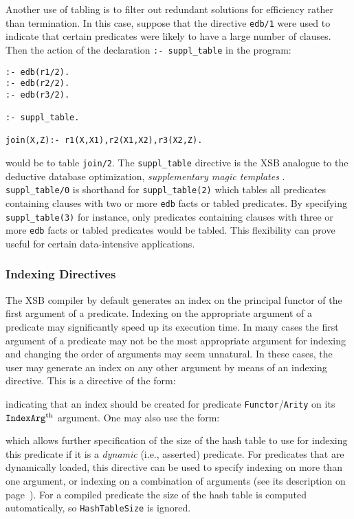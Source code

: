 Another use of tabling is to filter out redundant solutions for
efficiency rather than termination.  In this case, suppose that the
directive {\tt edb/1} were used to indicate that certain predicates were
likely to have a large number of clauses.  Then the action of the declaration
{\tt :- suppl\_table} in the program:
\begin{verbatim}
:- edb(r1/2).
:- edb(r2/2).
:- edb(r3/2).

:- suppl_table.

join(X,Z):- r1(X,X1),r2(X1,X2),r3(X2,Z).
\end{verbatim}
would be to table {\tt join/2}.  The {\tt suppl\_table} directive is
the XSB analogue to the deductive database optimization, {\em
supplementary magic templates} \cite{BeRa91}.  {\tt suppl\_table/0} is
shorthand for {\tt suppl\_table(2)} which tables all predicates
containing clauses with two or more {\tt edb} facts or tabled
predicates.  By specifying {\tt suppl\_table(3)} for instance, only
predicates containing clauses with three or more {\tt edb} facts or
tabled predicates would be tabled.  This flexibility can prove useful
for certain data-intensive applications.


\subsubsection{Indexing Directives}\label{indexing_directives}

The XSB compiler by default generates an index on the principal 
functor of the first argument of a predicate.  Indexing on the appropriate 
argument of a predicate may significantly speed up its execution time.  
In many cases the first argument of a predicate may not be the most
appropriate argument for indexing and changing the order of arguments
may seem unnatural.  In these cases, the user may generate an index
on any other argument by means of an indexing directive.  This is a
directive of the form:


\noindent
indicating that an index should be created for predicate 
{\tt Functor}/{\tt Arity} on its ${\tt IndexArg}^{\rm th}$ argument.
One may also use the form:


\noindent
which allows further specification of the size of the hash table to use for
indexing this predicate if it is a {\em dynamic} (i.e., asserted) predicate.
For predicates that are dynamically loaded, this directive can be used to
specify indexing on more than one argument, or indexing on a combination
of arguments (see its description on page~\pageref{index_dynamic}).
For a compiled predicate the size of the hash table is computed automatically,
so {\tt HashTableSize} is ignored.

